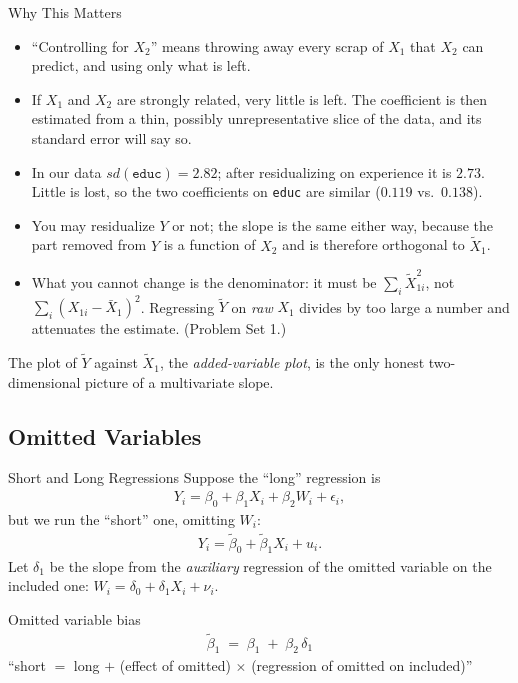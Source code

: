 \documentclass[aspectratio=169,11pt,xcolor=dvipsnames]{beamer}
\begin{document}
\begin{frame}[allowframebreaks,t]{Why This Matters}
\begin{itemize}\itemsep5pt
  \item ``Controlling for $X_2$'' means \alert{throwing away every scrap of $X_1$
        that $X_2$ can predict}, and using only what is left.
  \item If $X_1$ and $X_2$ are strongly related, very little is left. The
        coefficient is then estimated from a thin, possibly unrepresentative slice
        of the data, and its standard error will say so.
  \item In our data $sd(\texttt{educ}) = 2.82$; after residualizing on experience
        it is $2.73$. Little is lost, so the two coefficients on \texttt{educ}
        are similar ($0.119$ vs.\ $0.138$).
  \item You may residualize $Y$ or not; the slope is the same either way,
        because the part removed from $Y$ is a function of $X_2$ and is therefore
        orthogonal to $\tilde X_1$.
  \item \alert{What you cannot change is the denominator}: it must be
        $\sum_i \tilde X_{1i}^2$, not $\sum_i (X_{1i}-\bar X_1)^2$. Regressing
        $\tilde Y$ on \emph{raw} $X_1$ divides by too large a number and
        attenuates the estimate. (Problem Set 1.)
\end{itemize}
\vskip3pt
The plot of $\tilde Y$ against $\tilde X_1$, the \emph{added-variable plot}, 
is the only honest two-dimensional picture of a multivariate slope.
\end{frame}

\subsection*{Omitted Variables}
\begin{frame}\subsectionpage\end{frame}

\begin{frame}{Short and Long Regressions}
Suppose the ``long'' regression is
\begin{align*}
  Y_i = \beta_0 + \beta_1 X_i + \beta_2 W_i + \epsilon_i ,
\end{align*}
but we run the ``short'' one, omitting $W_i$:
\begin{align*}
  Y_i = \tilde\beta_0 + \tilde\beta_1 X_i + u_i .
\end{align*}
Let $\delta_1$ be the slope from the \emph{auxiliary} regression of the omitted
variable on the included one: $W_i = \delta_0 + \delta_1 X_i + \nu_i$.
\vskip6pt
\pause
\begin{block}{Omitted variable bias}
\begin{align*}
  \boxed{\;\tilde\beta_1 \;=\; \beta_1 \;+\; \beta_2\,\delta_1\;}
\end{align*}
\centering
\small ``short $=$ long $+$ (effect of omitted) $\times$ (regression of omitted
on included)''
\end{block}
\end{frame}
\end{document}

